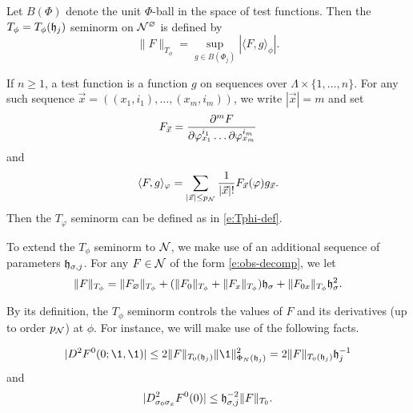 Let $B(\Phi)$ denote the unit $\Phi$-ball in the space of test functions. Then the
$T_\phi = T_\phi(\mathfrak{h}_j)$ seminorm on $\mathcal{N}^\varnothing$ is defined by
\begin{equation}
\label{e:Tphi-def}
\|F\|_{T_\phi} = \sup_{g\in B(\Phi_j)} |\langle F, g \rangle_\phi|.
\end{equation}

\begin{rk}
\label{rk:Tphi-n}
If $n \ge 1$, a test function is a function $g$ on sequences over $\Lambda\times\{1,\ldots,n\}$.
For any such sequence $\vec x = ((x_1, i_1), \ldots, (x_m, i_m))$, we write $|\vec x| = m$
and set
\begin{equation}
F_{\vec x}
	=
\frac{\partial ^m F}{\partial \varphi^{i_1}_{x_1} \ldots \partial\varphi^{i_m}_{x_m}}
\end{equation}
and
\begin{equation}
\label{e:pairing-boson}
\langle F, g \rangle_\varphi
	=
\sum_{|\vec x| \le p_{\mathcal{N}}} \frac{1}{|\vec x|!} F_{\vec x}(\varphi) g_{\vec x}.
\end{equation}
Then the $T_\varphi$ seminorm can be defined as in \eqref{e:Tphi-def}.
\end{rk}

To extend the $T_\phi$ seminorm to $\mathcal{N}$, we make use of an additional sequence
of parameters $\mathfrak{h}_{\sigma,j}$. For any $F \in \mathcal{N}$ of the form \eqref{e:obs-decomp},
we let
\begin{equation}
\label{e:Tphi-obs}
\|F\|_{T_\phi}
	=
\|F_\varnothing\|_{T_\phi}
	+ (\|F_0\|_{T_\phi} + \|F_x\|_{T_\phi}) \mathfrak{h}_\sigma
	+ \|F_{0x}\|_{T_\phi} \mathfrak{h}_\sigma^2.
\end{equation}

By its definition, the $T_\phi$ seminorm controls the values of $F$ and its derivatives
(up to order $p_{\mathcal{N}}$) at $\phi$. For instance, we will make use of the following facts.

\begin{lemma}
\label{lem:deriv-norm-bds}
\begin{equation}
\label{e:deriv-norm-bd}
\new{|D^2 F^\zero(0; \1, \1)|}
	\le
2 \|F\|_{T_0(\h_j)} \|\1\|^2_{\Phi_N(\h_j)}
	=
2 \|F\|_{T_0(\h_j)} \h_j^{-1}
\end{equation}
and
\begin{equation}
{|D^2_{\sigma_0\sigma_x} F^0(0)|}
	\le
\mathfrak{h}_{\sigma,j}^{-2} \|F\|_{T_0}.
\end{equation}
\end{lemma}

